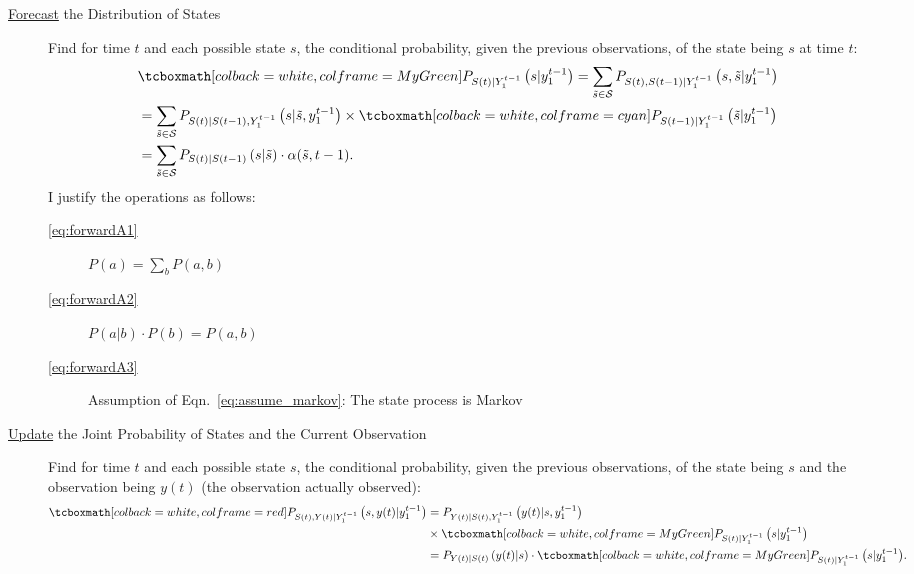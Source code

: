 \documentclass[]{article}
\newcommand{\ts}[3]{#1_{#2}^{#3}}                    %
\newcommand{\ti}[2]{{#1}{(#2)}}                  %
\newcommand{\states}{{\cal S}}
\begin{document}
\begin{description}
\item[\underline{Forecast} the Distribution of States] Find for time $t$ and each
  possible state $s$, the conditional probability, given the
  previous observations, of the state being $s$ at time $t$:
  \begin{subequations}
    \label{eq:forwardA}
    \begin{align}
      \label{eq:forwardA1}
      &\prealpha = \sum_{{\tilde s}\in\states}
      P_{\ti{S}{t},\ti{S}{t-1}|\ts{Y}{1}{t-1}} \left( s, {\tilde s}
      |\ts{y}{1}{t-1} \right)\\
      \label{eq:forwardA2}
      & = \sum_{{\tilde s}\in\states}
        P_{\ti{S}{t}|\ti{S}{t-1},\ts{Y}{1}{t-1}}
        \left( s|{\tilde s},\ts{y}{1}{t-1} \right) \times
       \alphax{t-1}{{\tilde s}} \\
      \label{eq:forwardA3}
      & = \sum_{{\tilde s}\in\states} P_{\ti{S}{t}|\ti{S}{t-1}} \left( s|{\tilde s} \right)
      \cdot \alpha({\tilde s},t-1) .
    \end{align}
  \end{subequations}
  I justify the operations as follows:
  \begin{description}
  \item[\eqref{eq:forwardA1}] $P(a) = \sum_b P(a,b)$
  \item[\eqref{eq:forwardA2}] $P(a|b)\cdot P(b) = P(a,b)$
  \item[\eqref{eq:forwardA3}] Assumption of
    Eqn.~\eqref{eq:assume_markov}: The state process is Markov
  \end{description}
\item[\underline{Update} the Joint Probability of States and the Current
  Observation] Find for time $t$ and each possible state $s$, the
  conditional probability, given the previous observations, of the
  state being $s$ and the observation being $\ti{y}{t}$ (the observation
  actually observed):
  \begin{subequations}
    \label{eq:forwardB}
    \begin{align}
      \label{eq:forwardB1}
      \pregamma &= P_{\ti{Y}{t} |
        \ti{S}{t},\ts{Y}{1}{t-1}}\left(\ti{y}{t} |s, \ts{y}{1}{t-1}
      \right) \nonumber \\& \times \prealpha\\
      \label{eq:forwardB2}
      &= P_{\ti{Y}{t} | \ti{S}{t}}\left(\ti{y}{t} |s \right) \cdot
      \prealpha .
    \end{align}
  \end{subequations}

\end{description}
\end{document}
